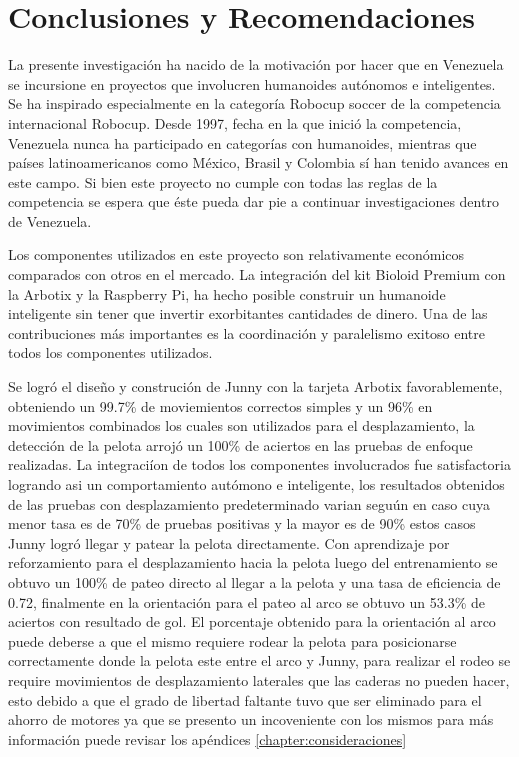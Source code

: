 \chapter{Conclusiones y Recomendaciones} \label{chapter:conclusiones}

\label{chap:conclusiones}

La presente investigación ha nacido de la motivación por hacer que en Venezuela se incursione en proyectos que involucren humanoides autónomos e inteligentes. Se ha inspirado especialmente en la categoría Robocup soccer de la competencia internacional Robocup. Desde 1997, fecha en la que inició la competencia, Venezuela nunca ha participado en categorías con humanoides, mientras que países latinoamericanos como México, Brasil y Colombia sí han tenido avances en este campo. Si bien este proyecto no cumple con todas las reglas de la competencia se espera que éste pueda dar pie a continuar investigaciones dentro de Venezuela.

Los componentes utilizados en este proyecto son relativamente económicos comparados con otros en el mercado. La integración del kit Bioloid Premium con la Arbotix y la Raspberry Pi, ha hecho posible construir un humanoide inteligente sin tener que invertir exorbitantes cantidades de dinero. Una de las contribuciones más importantes es la coordinación y paralelismo exitoso entre todos los componentes utilizados.

Se logr\'o el dise\~no y construci\'on de Junny con la tarjeta Arbotix favorablemente, obteniendo un 99.7\% de moviemientos correctos simples y un 96\% en movimientos combinados los cuales son utilizados para el desplazamiento, la detecci\'on de la pelota arroj\'o un 100\% de aciertos en las pruebas de enfoque realizadas. La integraci\'ion de todos los componentes involucrados fue satisfactoria logrando asi un comportamiento aut\'omono e inteligente, los resultados obtenidos de las pruebas con desplazamiento predeterminado varian segu\'un en caso cuya menor tasa es de 70\% de pruebas positivas y la mayor es de 90\% estos casos Junny logr\'o llegar y patear la pelota directamente. Con aprendizaje por reforzamiento para el desplazamiento hacia la pelota luego del entrenamiento se obtuvo un 100\% de pateo directo al llegar a la pelota y una tasa de eficiencia de 0.72, finalmente en la orientaci\'on para el pateo al arco se obtuvo un 53.3\% de aciertos con resultado de gol. 
El porcentaje obtenido para la orientaci\'on al arco puede deberse a que el mismo requiere rodear la pelota para posicionarse correctamente donde la pelota este entre el arco y Junny, para realizar el rodeo se require movimientos de desplazamiento laterales que las caderas no pueden hacer, esto debido a que el grado de libertad faltante tuvo que ser eliminado para el ahorro de motores ya que se presento un incoveniente con los mismos para m\'as informaci\'on puede revisar los ap\'endices \ref{chapter:consideraciones} 

